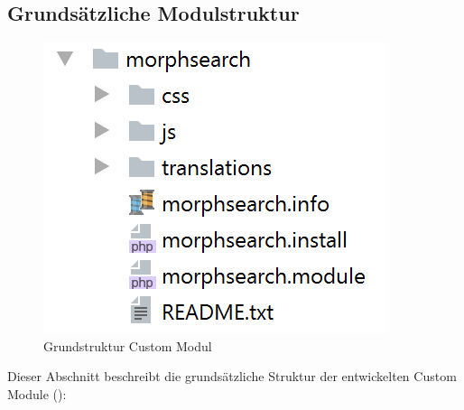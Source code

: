\subsection{Grundsätzliche Modulstruktur}\label{sub:strukture_module}
\begin{figure}
	\centering
	\includegraphics[height=0.2\textheight]{images/structure_module}
	\caption{Grundstruktur Custom Modul}
	\label{fig:structuremodule}
\end{figure}

Dieser Abschnitt beschreibt die grundsätzliche Struktur der entwickelten Custom Module ():

